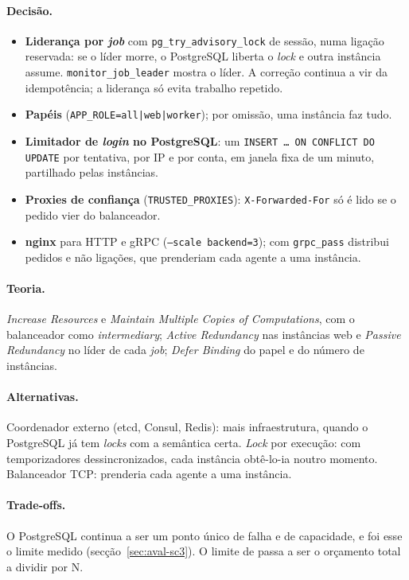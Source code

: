 \paragraph{Decisão.}
\begin{itemize}
  \item \textbf{Liderança por \emph{job}} com \texttt{pg\_try\_advisory\_lock} de sessão, numa ligação reservada: se o
    líder morre, o PostgreSQL liberta o \emph{lock} e outra instância assume. \texttt{monitor\_job\_leader} mostra o
    líder. A correção continua a vir da idempotência; a liderança só evita trabalho repetido.
  \item \textbf{Papéis} (\texttt{APP\_ROLE=all|web|worker}); por omissão, uma instância faz tudo.
  \item \textbf{Limitador de \emph{login} no PostgreSQL}: um \texttt{INSERT … ON CONFLICT DO UPDATE} por tentativa,
    por IP e por conta, em janela fixa de um minuto, partilhado pelas instâncias.
  \item \textbf{Proxies de confiança} (\texttt{TRUSTED\_PROXIES}): \texttt{X-Forwarded-For} só é lido se o pedido
    vier do balanceador.
  \item \textbf{nginx} para HTTP e gRPC (\texttt{--scale backend=3}); com \texttt{grpc\_pass} distribui pedidos e
    não ligações, que prenderiam cada agente a uma instância.
\end{itemize}

\paragraph{Teoria.}
\emph{Increase Resources} e \emph{Maintain Multiple Copies of Computations}, com o balanceador como
\emph{intermediary}; \emph{Active Redundancy} nas instâncias web e \emph{Passive Redundancy} no líder de cada
\emph{job}; \emph{Defer Binding} do papel e do número de instâncias.

\paragraph{Alternativas.}
Coordenador externo (etcd, Consul, Redis): mais infraestrutura, quando o PostgreSQL já tem \emph{locks} com a
semântica certa. \emph{Lock} por execução: com temporizadores dessincronizados, cada instância obtê-lo-ia noutro
momento. Balanceador TCP: prenderia cada agente a uma instância.

\paragraph{Trade-offs.}
O PostgreSQL continua a ser um ponto único de falha e de capacidade, e foi esse o limite medido
(secção~\ref{sec:aval-sc3}). O limite de  passa a ser o orçamento total a dividir por N.

